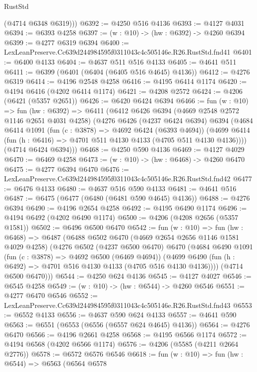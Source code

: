 \begin{lexlean}{RustStd}
\begin{coremodule}
        (@4714 @6348 @6319)))
@6392 := @4250 @516 @4136
@6393 := @4127 @4031
@6394 := @6393 @4258
@6397 := (w : @10) -> (hw : @6392) -> @4260 @6394
@6399 := @4277 @6319 @6394
@6400 := LexLeanPreserve.Cc639d244984595f0311043c4c505146e.R26.RustStd.fnd41
@6401 := @6400 @4133
@6404 := @4637 @511 @516 @4133
@6405 := @4641 @511
@6411 := @6399 (@6401 (@6404 (@6405 @516 @4645) @4136))
@6412 := @4276 @6319
@6414 := @4196 @2548 @4258
@6416 := @4195 @6414 @1174
@6420 := @4194 @6416 (@4202 @6414 @1174)
@6421 := @4208 @2572
@6424 := @4206 (@6421 (@5357 @2651))
@6426 := @6420 @6424 @6394
@6466 := fun (w : @10) =>
  fun (hw : @6392) =>
  @6411
    (@6412
      @6426
      @6394
      (@4669 @2548 @2572 @1146 @2651 @4031 @4258)
      (@4276
        @6426
        (@4237 @6424 @6394)
        @6394
        (@4684
          @6414
          @1091
          (fun (c : @3878) => @4692 @6424 (@6393 @4694))
          (@4699 @6414 (fun (h : @6416) => @4701 @511 @4130 @4133 (@4705 @511 @4130 @4136))))
        (@4714 @6424 @6394)))
@6468 := @4250 @590 @4136
@6469 := @4127 @4029
@6470 := @6469 @4258
@6473 := (w : @10) -> (hw : @6468) -> @4260 @6470
@6475 := @4277 @6394 @6470
@6476 := LexLeanPreserve.Cc639d244984595f0311043c4c505146e.R26.RustStd.fnd42
@6477 := @6476 @4133
@6480 := @4637 @516 @590 @4133
@6481 := @4641 @516
@6487 := @6475 (@6477 (@6480 (@6481 @590 @4645) @4136))
@6488 := @4276 @6394
@6490 := @4196 @2654 @4258
@6492 := @4195 @6490 @1174
@6496 := @4194 @6492 (@4202 @6490 @1174)
@6500 := @4206 (@4208 @2656 (@5357 @1581))
@6502 := @6496 @6500 @6470
@6542 := fun (w : @10) =>
  fun (hw : @6468) =>
  @6487
    (@6488
      @6502
      @6470
      (@4669 @2654 @2656 @1146 @1581 @4029 @4258)
      (@4276
        @6502
        (@4237 @6500 @6470)
        @6470
        (@4684
          @6490
          @1091
          (fun (c : @3878) => @4692 @6500 (@6469 @4694))
          (@4699 @6490 (fun (h : @6492) => @4701 @516 @4130 @4133 (@4705 @516 @4130 @4136))))
        (@4714 @6500 @6470)))
@6544 := @4250 @624 @4136
@6545 := @4127 @4027
@6546 := @6545 @4258
@6549 := (w : @10) -> (hw : @6544) -> @4260 @6546
@6551 := @4277 @6470 @6546
@6552 := LexLeanPreserve.Cc639d244984595f0311043c4c505146e.R26.RustStd.fnd43
@6553 := @6552 @4133
@6556 := @4637 @590 @624 @4133
@6557 := @4641 @590
@6563 := @6551 (@6553 (@6556 (@6557 @624 @4645) @4136))
@6564 := @4276 @6470
@6566 := @4196 @2661 @4258
@6568 := @4195 @6566 @1174
@6572 := @4194 @6568 (@4202 @6566 @1174)
@6576 := @4206 (@5585 (@4211 @2664 @2776))
@6578 := @6572 @6576 @6546
@6618 := fun (w : @10) =>
  fun (hw : @6544) =>
  @6563
    (@6564
      @6578

\end{coremodule}
\end{lexlean}

